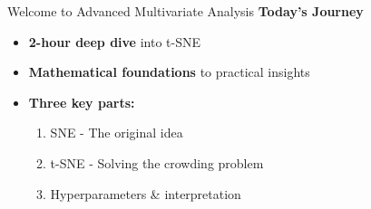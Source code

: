 \documentclass{beamer}
\begin{document}
\begin{frame}{Welcome to Advanced Multivariate Analysis}
\vspace{-0.2cm}
{\color{upcblue}\textbf{Today's Journey}}\\[0.2cm]
\begin{itemize}
    \setlength\itemsep{0.3em}
    \item \textbf{2-hour deep dive} into t-SNE
    \item \textbf{Mathematical foundations} to practical insights
    \item \textbf{Three key parts:}
    \begin{enumerate}
        \item SNE - The original idea
        \item t-SNE - Solving the crowding problem  
        \item Hyperparameters \& interpretation
    \end{enumerate}
\end{itemize}

\vspace{0.3cm}
\begin{center}
\end{center}
\end{frame}
\end{document}
